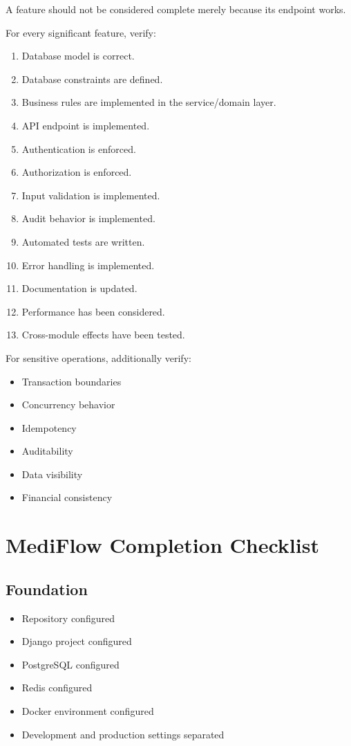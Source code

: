 \documentclass[11pt,a4paper]{article}
\newcommand{\task}[1]{\item[$\square$] #1}
\begin{document}
A feature should not be considered complete merely because its endpoint
works.

For every significant feature, verify:

\begin{enumerate}
    \item Database model is correct.
    \item Database constraints are defined.
    \item Business rules are implemented in the service/domain layer.
    \item API endpoint is implemented.
    \item Authentication is enforced.
    \item Authorization is enforced.
    \item Input validation is implemented.
    \item Audit behavior is implemented.
    \item Automated tests are written.
    \item Error handling is implemented.
    \item Documentation is updated.
    \item Performance has been considered.
    \item Cross-module effects have been tested.
\end{enumerate}

For sensitive operations, additionally verify:

\begin{itemize}
    \item Transaction boundaries
    \item Concurrency behavior
    \item Idempotency
    \item Auditability
    \item Data visibility
    \item Financial consistency
\end{itemize}

\section{MediFlow Completion Checklist}

\subsection*{Foundation}
\begin{itemize}
    \task{Repository configured}
    \task{Django project configured}
    \task{PostgreSQL configured}
    \task{Redis configured}
    \task{Docker environment configured}
    \task{Development and production settings separated}
\end{itemize}
\end{document}
